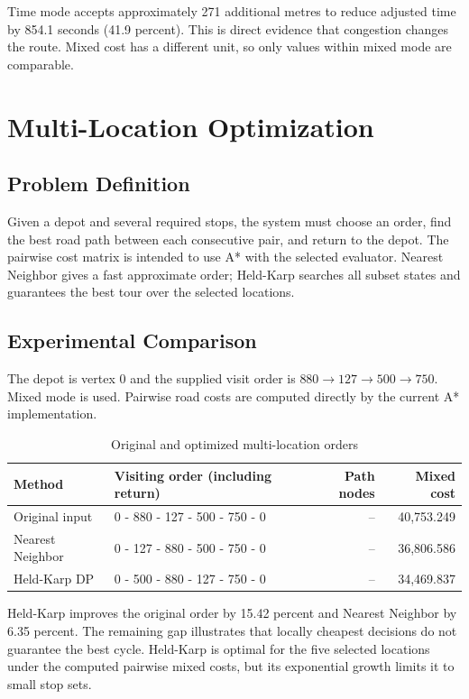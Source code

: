 \documentclass[12pt,a4paper,oneside]{report}
\begin{document}
Time mode accepts approximately 271 additional metres to reduce adjusted time
by 854.1 seconds (41.9 percent). This is direct evidence that congestion changes
the route. Mixed cost has a different unit, so only values within mixed mode are
comparable.

\chapter{Multi-Location Optimization}

\section{Problem Definition}
Given a depot and several required stops, the system must choose an order, find
the best road path between each consecutive pair, and return to the depot. The
pairwise cost matrix is intended to use A* with the selected evaluator. Nearest
Neighbor gives a fast approximate order; Held-Karp searches all subset states
and guarantees the best tour over the selected locations.

\section{Experimental Comparison}
The depot is vertex 0 and the supplied visit order is
$880\rightarrow127\rightarrow500\rightarrow750$. Mixed mode is used. Pairwise
road costs are computed directly by the current A* implementation.

\begin{table}[H]
\centering
\caption{Original and optimized multi-location orders}
\label{tab:tsp}
\small
\begin{tabularx}{\textwidth}{p{3.1cm}Xrr}
\toprule
\textbf{Method} & \textbf{Visiting order (including return)} &
\textbf{Path nodes} & \textbf{Mixed cost}\\
\midrule
Original input & 0 - 880 - 127 - 500 - 750 - 0 & -- & 40,753.249\\
Nearest Neighbor & 0 - 127 - 880 - 500 - 750 - 0 & -- & 36,806.586\\
Held-Karp DP & 0 - 500 - 880 - 127 - 750 - 0 & -- & 34,469.837\\
\bottomrule
\end{tabularx}
\end{table}

Held-Karp improves the original order by 15.42 percent and Nearest Neighbor by
6.35 percent. The remaining gap illustrates that locally cheapest decisions do
not guarantee the best cycle. Held-Karp is optimal for the five selected locations under the computed
pairwise mixed costs, but its exponential growth limits it to small stop sets.
\end{document}
